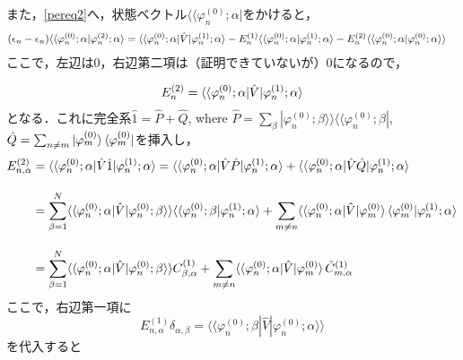 また，\eqref{pereq2}へ，状態ベクトル$\langle\langle{\varphi^{(0)}_{n};\alpha}|$をかけると，
\begin{align}
    (\epsilon_n-\epsilon_n)\langle\braket{\varphi^{(0)}_{n};\alpha|\varphi^{(2)}_n;\alpha}
    &=\langle\braket{\varphi^{(0)}_{n};\alpha|\hat{V}|\varphi^{(1)}_n;\alpha}
    -E^{(1)}_n\langle\braket{\varphi^{(0)}_{n};\alpha|\varphi^{(1)}_n;\alpha}
    -E^{(2)}_n\langle\langle\varphi^{(0)}_{n};\alpha|\varphi^{(0)}_n;\alpha\rangle\rangle
\end{align}
ここで，左辺は0，右辺第二項は（証明できていないが）0になるので，

\begin{align}
    E^{(2)}_n=
    \langle\braket{\varphi^{(0)}_{n};\alpha|\hat{V}|\varphi^{(1)}_n;\alpha}
\end{align}
となる．これに完全系$\hat{1}=\hat{P}+\hat{Q}$, where $\hat{P}=\sum_{\beta}|\varphi^{(0)}_{n};\beta\rangle\rangle\langle\langle\varphi^{(0)}_{n};\beta|$, $\hat{Q}=\sum_{n\neq m}\ket{\varphi^{(0)}_{m}}\bra{\varphi^{(0)}_{m}}$を挿入し，
\begin{align}
    E^{(2)}_{n,\alpha}&=
    \langle\braket{\varphi^{(0)}_{n};\alpha|\hat{V}\hat{1}|\varphi^{(1)}_n;\alpha}
    =\langle\braket{\varphi^{(0)}_{n};\alpha|\hat{V}\hat{P}|\varphi^{(1)}_n;\alpha}
    +\langle\braket{\varphi^{(0)}_{n};\alpha|\hat{V}\hat{Q}|\varphi^{(1)}_n;\alpha}
    \nn[10pt]
    &=\sum_{\beta=1}^{N}
    \langle\braket{\varphi^{(0)}_{n};\alpha|\hat{V}|\varphi^{(0)}_n;\beta}\rangle
    \langle\braket{\varphi^{(0)}_n;\beta|\varphi^{(1)}_n;\alpha}
    +\sum_{m\neq n}
    \langle\braket{\varphi^{(0)}_{n};\alpha|\hat{V}|\varphi^{(0)}_m}
    \braket{\varphi^{(0)}_m|\varphi^{(1)}_n;\alpha}\nn[10pt]
    &=\sum_{\beta=1}^{N}
    \langle\braket{\varphi^{(0)}_{n};\alpha|\hat{V}|\varphi^{(0)}_n;\beta}\rangle
    C^{(1)}_{\beta,\alpha}
    +\sum_{m\neq n}
    \langle\braket{\varphi^{(0)}_{n};\alpha|\hat{V}|\varphi^{(0)}_m}
    \Tilde{C}^{(1)}_{m,\alpha}
\end{align}
ここで，右辺第一項に
\begin{equation}
    E^{(1)}_{n,\alpha}\delta_{\alpha,\beta}
    =\langle\langle{\varphi^{(0)}_n;\beta|\hat{V}|\varphi^{(0)}_n;\alpha}\rangle\rangle
\end{equation}
を代入すると
